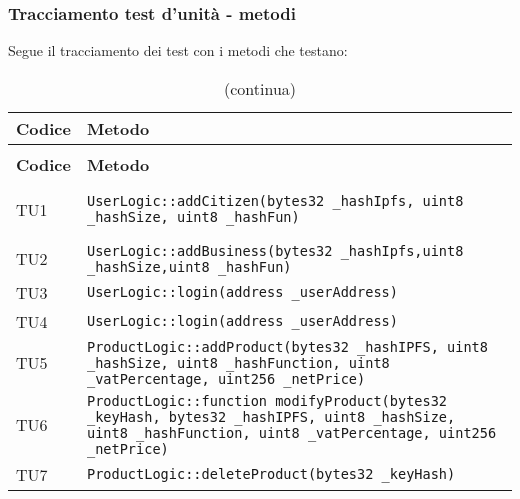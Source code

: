 \subsubsection{Tracciamento test d'unità - metodi}
Segue il tracciamento dei test con i metodi che testano:
		\renewcommand{\arraystretch}{1.5}
		
		\begin{longtable}{ >{\centering}p{} >{}p{}}
			
			\caption{Tracciamento test di unità - metodi}\\	
			\rowcolorhead
			\textbf{\color{white}Codice} 
			& \centering\textbf{\color{white}Metodo}  
			\tabularnewline %
			\endfirsthead	
			
			\rowcolor{white}\caption[]{(continua)}\\	
			\rowcolorhead
			\textbf{\color{white}Codice} 
			& \centering\textbf{\centering\color{white}Metodo} 
			\tabularnewline %
			\endhead	
			
			
			
			\hypertarget{TU1}{TU1} & \texttt{UserLogic::addCitizen(bytes32 \_hashIpfs, uint8 \_hashSize, uint8 \_hashFun)}\\ 
			
			\hypertarget{TU2}{TU2} & \texttt{UserLogic::addBusiness(bytes32 
			\_hashIpfs,uint8 \_hashSize,uint8 \_hashFun)}\\
			
			\hypertarget{TU3}{TU3} & \texttt{UserLogic::login(address 
			\_userAddress)}\\
			
			\hypertarget{TU4}{TU4} & \texttt{UserLogic::login(address 
			\_userAddress)}\\
			
			\hypertarget{TU5}{TU5} & \texttt{ProductLogic::addProduct(bytes32 
			\_hashIPFS, uint8 \_hashSize, uint8 \_hashFunction, uint8 
			\_vatPercentage, uint256 \_netPrice)}\\
			
			\hypertarget{TU6}{TU6} & \texttt{ProductLogic::function 
			modifyProduct(bytes32 \_keyHash, bytes32 \_hashIPFS, uint8 
			\_hashSize, uint8 \_hashFunction, uint8 \_vatPercentage, uint256 
			\_netPrice)}\\
			
			\hypertarget{TU7}{TU7} & 
			\texttt{ProductLogic::deleteProduct(bytes32 \_keyHash)}\\
			

\end{longtable}
